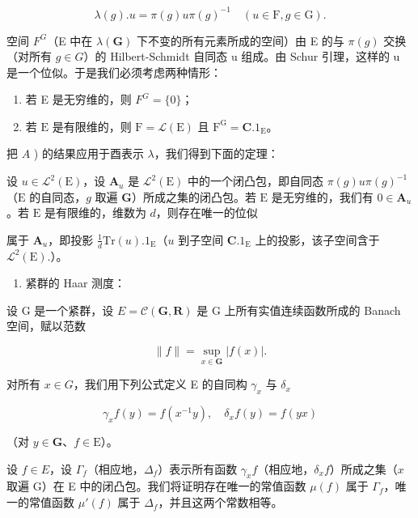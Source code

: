 \[
\lambda (g). u = \pi (g) u \pi (g) ^ {- 1} \quad (u \in \mathrm{F}, g \in \mathrm{G}).\tag{3}
\]

空间 \(F^{G}\)（E 中在 \(\lambda(\mathbf{G})\) 下不变的所有元素所成的空间）由 E 的与 \(\pi(g)\) 交换（对所有 \(g \in G\)）的 Hilbert-Schmidt 自同态 u 组成。由 Schur 引理，这样的 u 是一个位似。于是我们必须考虑两种情形：

\begin{enumerate}
\def\labelenumi{\arabic{enumi})}
\item
  若 E 是无穷维的，则 \(F^{G} = \{0\}\)；
\item
  若 \(\mathrm{E}\) 是有限维的，则 \(\mathrm{F} = \mathcal{L}(\mathrm{E})\) 且 \(\mathrm{F}^{\mathrm{G}} = \mathbf{C}.1_{\mathrm{E}}\)。
\end{enumerate}

把 \(A\) ) 的结果应用于酉表示 \(\lambda\)，我们得到下面的定理：

设 \(u \in \mathcal{L}^2(\mathrm{E})\)，设 \(\mathbf{A}_u\) 是 \(\mathcal{L}^2(\mathrm{E})\) 中的一个闭凸包，即自同态 \(\pi(g) u\pi(g)^{-1}\)（\(\mathrm{E}\) 的自同态，\(g\) 取遍 \(\mathbf{G}\)）所成之集的闭凸包。若 \(\mathrm{E}\) 是无穷维的，我们有 \(0 \in \mathbf{A}_u\)。若 \(\mathrm{E}\) 是有限维的，维数为 \(d\)，则存在唯一的位似

属于 \(\mathbf{A}_u\)，即投影 \(\frac{1}{d}\mathrm{Tr}(u).1_{\mathrm{E}}\)（\(u\) 到子空间 \(\mathbf{C}.1_{\mathrm{E}}\) 上的投影，该子空间含于 \(\mathcal{L}^2 (\mathrm{E}).\)）。

\begin{enumerate}
\def\labelenumi{\Alph{enumi})}
\setcounter{enumi}{2}
\tightlist
\item
  紧群的 Haar 测度：
\end{enumerate}

设 G 是一个紧群，设 \(E = \mathcal{C}(\mathbf{G}, \mathbf{R})\) 是 G 上所有实值连续函数所成的 Banach 空间，赋以范数

\[
\| f \| = \sup _ {x \in \mathbf {G}} | f (x) |.\tag{4}
\]

对所有 \(x \in G\)，我们用下列公式定义 E 的自同构 \(\gamma_{x}\) 与 \(\delta_{x}\)

\[
\gamma_ {x} f (y) = f \left(x ^ {- 1} y\right), \quad \delta_ {x} f (y) = f (y x)\tag{5}
\]

（对 \(y \in \mathbf{G}\)、\(f \in \mathrm{E}\)）。

设 \(f \in E\)，设 \(\Gamma_f\)（相应地，\(\Delta_f\)）表示所有函数 \(\gamma_x f\)（相应地，\(\delta_x f\)）所成之集（\(x\) 取遍 G）在 E 中的闭凸包。我们将证明存在唯一的常值函数 \(\mu(f)\) 属于 \(\Gamma_f\)，唯一的常值函数 \(\mu'(f)\) 属于 \(\Delta_f\)，并且这两个常数相等。

